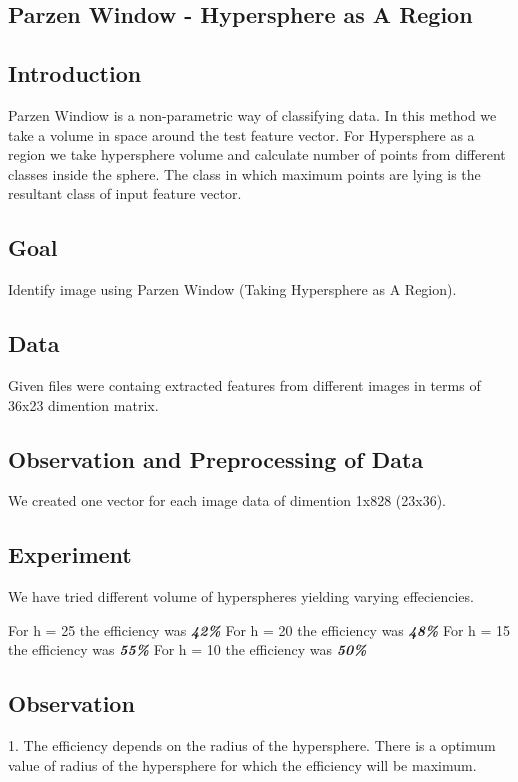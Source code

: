 \begin{center}
\section{Parzen Window - Hypersphere as A Region}
\end{center}

\subsection{Introduction}
\begin{flushleft}
 Parzen Windiow is a non-parametric way of classifying data. In this method we take a volume in
  space around the test feature vector. For Hypersphere as a region we take hypersphere volume
  and calculate number of points from different classes inside the sphere.
  The class in which maximum points are lying is the resultant class of input feature vector.
\end{flushleft}

\subsection{Goal}
\begin{flushleft}
    Identify image using Parzen Window (Taking Hypersphere as A Region).
\end{flushleft}

\subsection{Data}
\begin{flushleft}
    Given files were containg extracted features from different images in terms of 36x23 dimention matrix.
\end{flushleft}


\subsection{Observation and Preprocessing of Data}
\begin{flushleft}
  We created one vector for each image data of dimention 1x828 (23x36).
\end{flushleft}

\subsection{Experiment}
\begin{flushleft}
    We have tried different volume of hyperspheres yielding varying effeciencies.

    For h = 25 the efficiency was \textbf{\textit{42\%}}
    For h = 20 the efficiency was \textbf{\textit{48\%}}
    For h = 15 the efficiency was \textbf{\textit{55\%}}
    For h = 10 the efficiency was \textbf{\textit{50\%}}
\end{flushleft}

\subsection{Observation}
\begin{flushleft}
  1. The efficiency depends on the radius of the hypersphere.
  There is a optimum value of radius of the hypersphere for which the efficiency will be maximum.
\end{flushleft}
